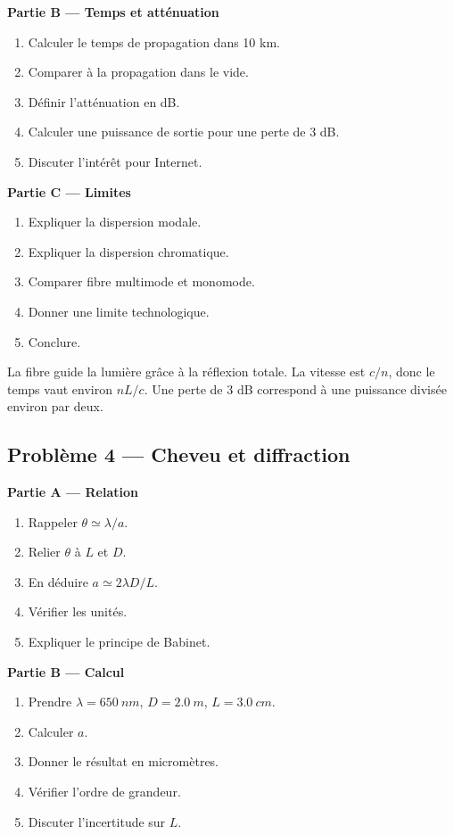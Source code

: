 \documentclass[11pt,a4paper]{article}
\begin{document}
\textbf{Partie B — Temps et atténuation}
\begin{enumerate}
  \item Calculer le temps de propagation dans 10 km.
  \item Comparer à la propagation dans le vide.
  \item Définir l'atténuation en dB.
  \item Calculer une puissance de sortie pour une perte de 3 dB.
  \item Discuter l'intérêt pour Internet.
\end{enumerate}

\textbf{Partie C — Limites}
\begin{enumerate}
  \item Expliquer la dispersion modale.
  \item Expliquer la dispersion chromatique.
  \item Comparer fibre multimode et monomode.
  \item Donner une limite technologique.
  \item Conclure.
\end{enumerate}

\begin{corrigebox}
La fibre guide la lumière grâce à la réflexion totale. La vitesse est $c/n$, donc le temps vaut environ $nL/c$. Une perte de 3 dB correspond à une puissance divisée environ par deux.
\end{corrigebox}

\subsection{Problème 4 — Cheveu et diffraction}

\textbf{Partie A — Relation}
\begin{enumerate}
  \item Rappeler $\theta\simeq\lambda/a$.
  \item Relier $\theta$ à $L$ et $D$.
  \item En déduire $a\simeq2\lambda D/L$.
  \item Vérifier les unités.
  \item Expliquer le principe de Babinet.
\end{enumerate}

\textbf{Partie B — Calcul}
\begin{enumerate}
  \item Prendre $\lambda=\SI{650}{nm}$, $D=\SI{2.0}{m}$, $L=\SI{3.0}{cm}$.
  \item Calculer $a$.
  \item Donner le résultat en micromètres.
  \item Vérifier l'ordre de grandeur.
  \item Discuter l'incertitude sur $L$.
\end{enumerate}
\end{document}

